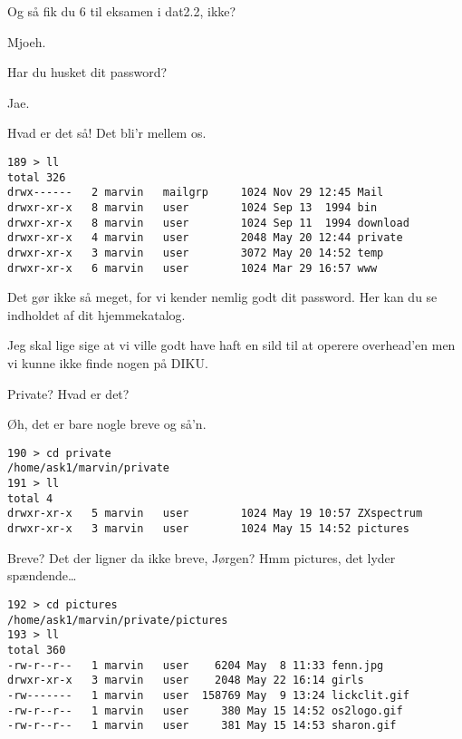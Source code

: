 \documentclass[10pt]{article}
\begin{document}
\begin{sketch}
 Og så fik du 6 til eksamen i dat2.2, ikke?

 Mjoeh.

 Har du husket dit password?

 Jae.

 Hvad er det så! Det bli'r mellem os.


\begin{verbatim}
189 > ll
total 326
drwx------   2 marvin   mailgrp     1024 Nov 29 12:45 Mail
drwxr-xr-x   8 marvin   user        1024 Sep 13  1994 bin
drwxr-xr-x   8 marvin   user        1024 Sep 11  1994 download
drwxr-xr-x   4 marvin   user        2048 May 20 12:44 private
drwxr-xr-x   3 marvin   user        3072 May 20 14:52 temp
drwxr-xr-x   6 marvin   user        1024 Mar 29 16:57 www
\end{verbatim}

 Det gør ikke så meget, for vi kender nemlig godt dit
password. Her kan du se indholdet af dit hjemmekatalog.

 Jeg skal lige sige at vi ville godt have haft en sild
til at operere overhead'en men vi kunne ikke finde nogen på DIKU.


 Private? Hvad er det?

 Øh, det er bare nogle breve og så'n.


\begin{verbatim}
190 > cd private
/home/ask1/marvin/private
191 > ll
total 4
drwxr-xr-x   5 marvin   user        1024 May 19 10:57 ZXspectrum
drwxr-xr-x   3 marvin   user        1024 May 15 14:52 pictures
\end{verbatim}

 Breve? Det der ligner da ikke breve, Jørgen? 
Hmm pictures, det lyder spændende\ldots

\begin{verbatim}
192 > cd pictures
/home/ask1/marvin/private/pictures
193 > ll
total 360
-rw-r--r--   1 marvin   user    6204 May  8 11:33 fenn.jpg
drwxr-xr-x   3 marvin   user    2048 May 22 16:14 girls
-rw-------   1 marvin   user  158769 May  9 13:24 lickclit.gif
-rw-r--r--   1 marvin   user     380 May 15 14:52 os2logo.gif
-rw-r--r--   1 marvin   user     381 May 15 14:53 sharon.gif
\end{verbatim}


\end{sketch}
\end{document}
